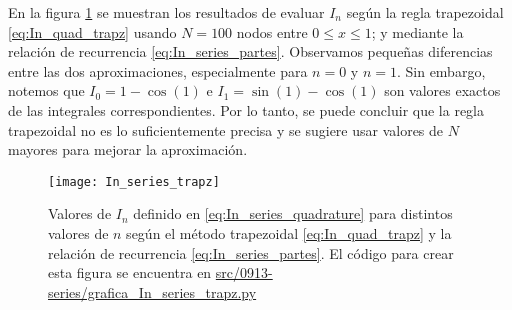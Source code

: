 \documentclass[../portafolio.tex]{subfiles}
\begin{document}
En la figura \ref{fig:In_series_trapz} se muestran los resultados de
evaluar $I_n$ según la regla trapezoidal \eqref{eq:In_quad_trapz}
usando $N=100$ nodos entre $0\leq x \leq 1$; y mediante la relación de
recurrencia \eqref{eq:In_series_partes}. Observamos pequeñas
diferencias entre las dos aproximaciones, especialmente para $n=0$ y
$n=1$. Sin embargo, notemos que $I_0=1 -\cos(1)$ e
$I_1=\sin(1)-\cos(1)$ son valores exactos de las integrales
correspondientes. Por lo tanto, se puede concluir que la regla
trapezoidal no es lo suficientemente precisa y se sugiere usar
valores de $N$ mayores para mejorar la aproximación.
\begin{figure}[ht!]
  \centering
  \texttt{[image: In\_series\_trapz]}
  \caption{Valores de $I_n$ definido en \eqref{eq:In_series_quadrature} para distintos valores de $n$ según el método trapezoidal \eqref{eq:In_quad_trapz} y la relación de recurrencia \eqref{eq:In_series_partes}. El código para crear esta figura se encuentra en \href{src/0913-series/grafica\_In\_series\_trapz.py}{src/0913-series/grafica\_In\_series\_trapz.py}}
  \label{fig:In_series_trapz}
\end{figure}
  

  
\end{document}
